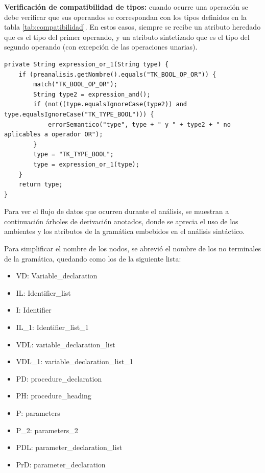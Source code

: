 \textbf{Verificación de compatibilidad de tipos:} cuando ocurre una operación se debe verificar que sus operandos se correspondan con los tipos definidos en la tabla \ref{tab:compatibilidad}. En estos casos, siempre se recibe un atributo heredado que es el tipo del primer operando, y un atributo sintetizado que es el tipo del segundo operando (con excepción de las operaciones unarias).

\begin{verbatim}
private String expression_or_1(String type) {
	if (preanalisis.getNombre().equals("TK_BOOL_OP_OR")) {
		match("TK_BOOL_OP_OR");
		String type2 = expression_and();
		if (not((type.equalsIgnoreCase(type2)) and type.equalsIgnoreCase("TK_TYPE_BOOL"))) {
			errorSemantico("type", type + " y " + type2 + " no aplicables a operador OR");
		}
		type = "TK_TYPE_BOOL";
		type = expression_or_1(type);
	}
	return type;
}
\end{verbatim}

Para ver el flujo de datos que ocurren durante el análisis, se muestran a continuación árboles de derivación anotados, donde se aprecia el uso de los ambientes y los atributos de la gramática  embebidos en el análisis sintáctico.

Para simplificar el nombre de los nodos, se abrevió el nombre de los no terminales de la gramática, quedando como los de la siguiente lista:
\begin{itemize}
    \item VD: Variable\_declaration
    \item IL: Identifier\_list
    \item I: Identifier
    \item IL\_1: Identifier\_list\_1
    \item VDL: variable\_declaration\_list
    \item VDL\_1: variable\_declaration\_list\_1
    \item PD: procedure\_declaration
    \item PH: procedure\_heading
    \item P: parameters
    \item P\_2: parameters\_2
    \item PDL: parameter\_declaration\_list
    \item PrD: parameter\_declaration
\end{itemize}

